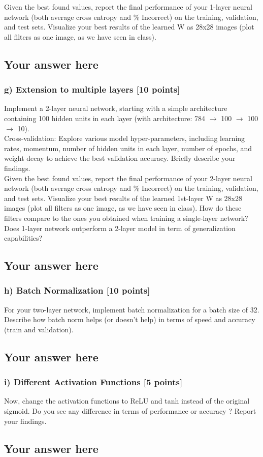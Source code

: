 \documentclass{article}
\begin{document}
Given the best found values, report the final performance of your 1-layer neural
network (both average cross entropy and \% Incorrect) on the training, validation, and test sets.
Visualize your best results of the learned W as 28x28 images 
(plot all filters as one image, as we have seen in class).

\subsection*{Your answer here}

\subsubsection*{g) Extension to multiple layers [10 points]}
Implement a 2-layer neural network, starting with a simple architecture 
containing 100 hidden units in each layer
(with architecture: 784 $\rightarrow$ 100 $\rightarrow$ 100 $\rightarrow$  10).
\\
  
Cross-validation: Explore various model hyper-parameters, including learning rates, 
momentum, number of hidden units in each layer, number of epochs, and weight decay 
to achieve the best validation accuracy. Briefly describe your findings.  
\\

Given the best found values, report the final performance of your 2-layer neural
network (both average cross entropy and \% Incorrect) on the training, validation, and test sets.
Visualize your best results of the learned 1st-layer W as 28x28 images 
(plot all filters as one image, as we have seen in class).
How do these filters compare to the ones you obtained when training a
single-layer network?
\\

Does 1-layer network outperform a 2-layer model in term of generalization capabilities?


\subsection*{Your answer here}

\subsubsection*{h) Batch Normalization [10 points]}

For your two-layer network, implement batch normalization for a batch size of 32. Describe how batch norm helps (or doesn't help) in terms of speed and accuracy (train and validation). 


\subsection*{Your answer here}

\subsubsection*{i) Different Activation Functions [5 points]}

Now, change the activation functions to ReLU and tanh instead of the original sigmoid. Do you see any difference in terms of performance or accuracy ? Report your findings.

\subsection*{Your answer here}
\end{document}
